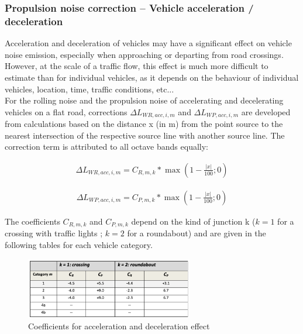 \documentclass{article}
\begin{document}
\subsubsection{Propulsion noise correction – Vehicle acceleration / deceleration}

\noindent Acceleration and deceleration of vehicles may have a significant effect on vehicle noise emission, especially when approaching or departing from road crossings. However, at the scale of a traffic flow, this effect is much more difficult to estimate than for individual vehicles, as it depends on the behaviour of individual vehicles, location, time, traffic conditions, etc... \\
\noindent For the rolling noise and the propulsion noise of accelerating and decelerating vehicles on a flat road, corrections $\Delta L_{WR,acc,i,m}$ and $\Delta L_{WP,acc,i,m}$ are developed from calculations based on the distance x (in m) from the point source to the nearest intersection of the respective source line with another source line. The correction term is attributed to all octave bands equally:

\begin{equation}
    \label{Delta L_R}
    \begin{aligned}
        \Delta L_{WR,acc,i,m} = C_{R,m,k}* \max(1-\frac{|x|}{100} ;0)
    \end{aligned}
\end{equation}

\begin{equation}
    \label{Delta L_P}
    \begin{aligned}
        \Delta L_{WP,acc,i,m} = C_{P,m,k}* \max(1-\frac{|x|}{100} ;0)
    \end{aligned}
\end{equation}

\noindent The coefficients $C_{R,m,k}$ and $C_{P,m,k}$ depend on the kind of junction k ($k = 1$ for a crossing with traffic lights ; $k = 2$ for a roundabout) and are given in the following tables for each vehicle category.

\begin{figure}[H]
\caption{Coefficients for acceleration and deceleration effect}
\label{Coefficients for acceleration and deceleration effect}
\centering
\includegraphics[width=0.65\textwidth]{CNOSSOS/Coefficients for acceleration and deceleration effect.png}
\end{figure}
\end{document}
